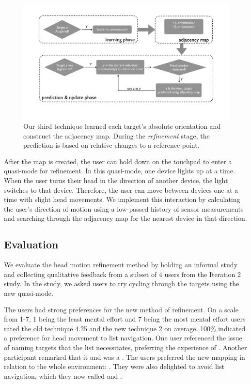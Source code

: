 \begin{figure}[t]
\centering
\includegraphics[width=0.95\columnwidth]{figures/third_technique.pdf}
\caption{Our third technique learned each target's absolute orientation and
construct the adjacency map. During the {\em refinement} stage, the prediction
is based on relative changes to a reference point.}
\label{fig:third_technique}
\end{figure}

After the map is created, the user can hold down on the touchpad to enter a
quasi-mode for refinement. In this quasi-mode, one device lights up at a time.
When the user turns their head in the direction of another device, the light
switches to that device. Therefore, the user can move between devices one at a
time with slight head movements. We implement this interaction by calculating
the user's direction of motion using a low-passed history of sensor
measurements and searching through the adjacency map for the nearest device in
that direction.

\subsection{Evaluation}
We evaluate the head motion refinement method by holding an informal study and
collecting qualitative feedback from a subset of 4 users from the Iteration 2
study. In the study, we asked users to try cycling through the targets using
the new quasi-mode.

The users had strong preferences for the new method of refinement. On a scale
from 1-7, 1 being the least mental effort and 7 being the most mental effort
users rated the old technique 4.25 and the new technique 2 on average. 100\%
indicated a preference for head movement to list navigation. One user
referenced the issue of naming targets that the list necessitates, preferring
the experience of .
Another participant remarked that it  and was
a . The users
preferred the new mapping in relation to the whole environment: . They
were also delighted to avoid list navigation, which they now called
 and .
